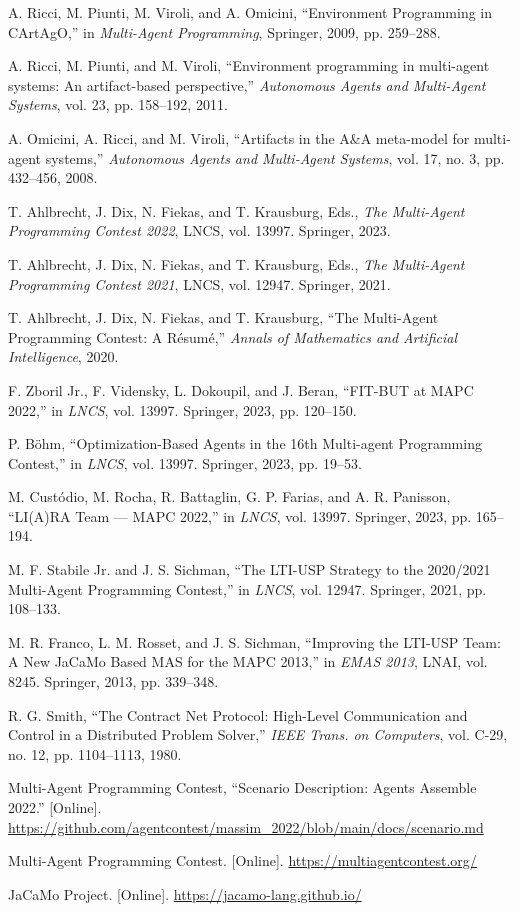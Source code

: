 \documentclass[11pt,a4paper]{article}
\begin{document}
{\begin{list}{}{\setlength{\leftmargin}{2.0em}\setlength{\itemindent}{-2.0em}\setlength{\itemsep}{3pt}}
\item [11] A. Ricci, M. Piunti, M. Viroli, and A. Omicini, ``Environment Programming in CArtAgO,'' in \emph{Multi-Agent Programming}, Springer, 2009, pp. 259--288.
\item [12] A. Ricci, M. Piunti, and M. Viroli, ``Environment programming in multi-agent systems: An artifact-based perspective,'' \emph{Autonomous Agents and Multi-Agent Systems}, vol. 23, pp. 158--192, 2011.
\item [13] A. Omicini, A. Ricci, and M. Viroli, ``Artifacts in the A\&A meta-model for multi-agent systems,'' \emph{Autonomous Agents and Multi-Agent Systems}, vol. 17, no. 3, pp. 432--456, 2008.
\item [14] T. Ahlbrecht, J. Dix, N. Fiekas, and T. Krausburg, Eds., \emph{The Multi-Agent Programming Contest 2022}, LNCS, vol. 13997. Springer, 2023.
\item [15] T. Ahlbrecht, J. Dix, N. Fiekas, and T. Krausburg, Eds., \emph{The Multi-Agent Programming Contest 2021}, LNCS, vol. 12947. Springer, 2021.
\item [16] T. Ahlbrecht, J. Dix, N. Fiekas, and T. Krausburg, ``The Multi-Agent Programming Contest: A Résumé,'' \emph{Annals of Mathematics and Artificial Intelligence}, 2020.
\item [17] F. Zboril Jr., F. Vidensky, L. Dokoupil, and J. Beran, ``FIT-BUT at MAPC 2022,'' in \emph{LNCS}, vol. 13997. Springer, 2023, pp. 120--150.
\item [18] P. Böhm, ``Optimization-Based Agents in the 16th Multi-agent Programming Contest,'' in \emph{LNCS}, vol. 13997. Springer, 2023, pp. 19--53.
\item [19] M. Custódio, M. Rocha, R. Battaglin, G. P. Farias, and A. R. Panisson, ``LI(A)RA Team --- MAPC 2022,'' in \emph{LNCS}, vol. 13997. Springer, 2023, pp. 165--194.
\item [20] M. F. Stabile Jr. and J. S. Sichman, ``The LTI-USP Strategy to the 2020/2021 Multi-Agent Programming Contest,'' in \emph{LNCS}, vol. 12947. Springer, 2021, pp. 108--133.
\item [21] M. R. Franco, L. M. Rosset, and J. S. Sichman, ``Improving the LTI-USP Team: A New JaCaMo Based MAS for the MAPC 2013,'' in \emph{EMAS 2013}, LNAI, vol. 8245. Springer, 2013, pp. 339--348.
\item [22] R. G. Smith, ``The Contract Net Protocol: High-Level Communication and Control in a Distributed Problem Solver,'' \emph{IEEE Trans. on Computers}, vol. C-29, no. 12, pp. 1104--1113, 1980.
\item [23] Multi-Agent Programming Contest, ``Scenario Description: Agents Assemble 2022.'' [Online]. \url{https://github.com/agentcontest/massim_2022/blob/main/docs/scenario.md}
\item [24] Multi-Agent Programming Contest. [Online]. \url{https://multiagentcontest.org/}
\item [25] JaCaMo Project. [Online]. \url{https://jacamo-lang.github.io/}

\end{list}
}
\end{document}
